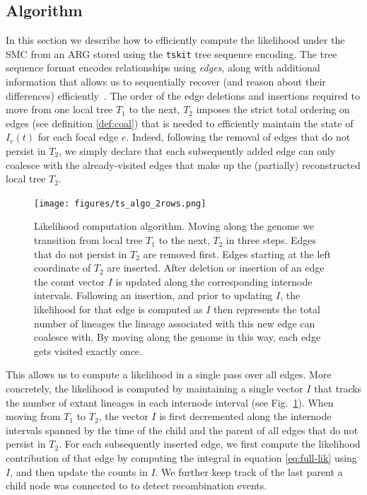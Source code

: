 \documentclass{article}
\begin{document}
\subsection*{Algorithm} \label{par:algo}
In this section we describe how to efficiently compute the likelihood under the SMC
from an ARG stored using the \texttt{tskit} tree sequence encoding. 
The tree sequence format encodes relationships using \emph{edges},
along with additional information that
allows us to sequentially recover (and reason about 
their differences) 
efficiently~\citep{kelleher_efficient_2016, ralph_efficiently_2020}.
The order of the edge deletions and insertions required to move from one local tree $T_1$ to
the next, $T_2$ imposes the strict total ordering on edges
(see definition \eqref{def:coal})
that is needed to efficiently maintain the state of $I_e(t)$ for each focal edge $e$.
Indeed, following the removal of edges that do not persist in $T_2$,
we simply declare that each subsequently added edge
can only coalesce with the already-visited edges 
that make up the (partially) reconstructed local tree $T_2$.

\begin{figure}[!ht]
\centering
\texttt{[image: figures/ts\_algo\_2rows.png]}
\caption{Likelihood computation algorithm. 
Moving along the genome we transition from
local tree $T_1$ to the next, $T_2$ in three steps. 
Edges that do not persist in $T_2$ are
removed first. Edges starting at the left coordinate of $T_2$ are inserted.
After deletion or insertion of an edge the count vector $I$ is updated along the
corresponding internode intervals. Following an insertion, and prior to updating $I$,
the likelihood for that edge is computed as $I$ then represents the total number of
lineages the lineage associated with this new edge can
coalesce with. By moving along the genome in this way, each edge gets visited exactly once.}
\label{fig:algo}
\end{figure}

This allows us to compute a likelihood in a single pass over all edges.
More concretely, the likelihood is computed by maintaining a single vector $I$ that tracks
the number of extant lineages in each internode interval (see Fig.~\ref{fig:algo}).
When moving from $T_1$ to $T_2$, the vector $I$ is first decremented along 
the internode intervals
spanned by the time of the child and the parent of all edges that do not persist in $T_2$.
For each subsequently inserted edge, we first compute the likelihood contribution
of that edge by computing the integral
in equation \eqref{eq:full-lik} using $I$, and then update the counts in $I$.
We further keep track of
the last parent a child node was connected to to detect recombination events.
\end{document}
